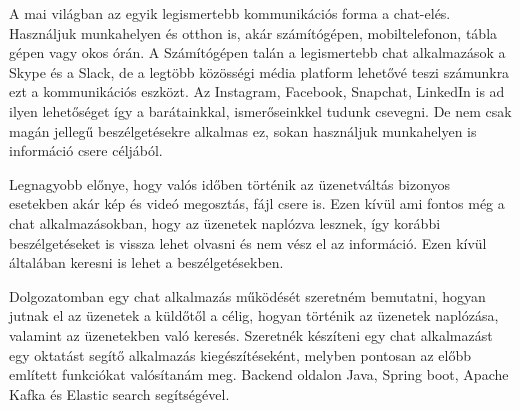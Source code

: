 
A mai világban az egyik legismertebb kommunikációs forma a chat-elés. Használjuk munkahelyen és otthon is, akár számítógépen, mobiltelefonon, tábla gépen vagy okos órán. A Számítógépen talán a legismertebb chat alkalmazások a Skype és a Slack, de a legtöbb közösségi média platform lehetővé teszi számunkra ezt a kommunikációs eszközt. Az Instagram, Facebook, Snapchat, LinkedIn is ad ilyen lehetőséget így a barátainkkal, ismerőseinkkel tudunk csevegni. De nem csak magán jellegű beszélgetésekre alkalmas ez, sokan használjuk munkahelyen is információ csere céljából.

Legnagyobb előnye, hogy valós időben történik az üzenetváltás bizonyos esetekben akár kép és videó megosztás, fájl csere is.  Ezen kívül ami fontos még a chat alkalmazásokban, hogy az üzenetek naplózva lesznek, így korábbi beszélgetéseket is vissza lehet olvasni és nem vész el az információ. Ezen kívül általában keresni is lehet a beszélgetésekben.

Dolgozatomban egy chat alkalmazás működését szeretném bemutatni, hogyan jutnak el az üzenetek a küldőtől a célig, hogyan történik az üzenetek naplózása, valamint az üzenetekben való keresés.  Szeretnék készíteni egy chat alkalmazást egy oktatást segítő alkalmazás kiegészítéseként, melyben pontosan az előbb említett funkciókat valósítanám meg. Backend oldalon Java, Spring boot, Apache Kafka és Elastic search segítségével.
